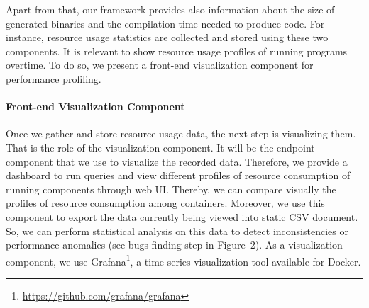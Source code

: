 Apart from that, our framework provides also information about the size of generated binaries and the compilation time needed to produce code.
For instance, resource usage statistics are collected and stored using these two components. It is relevant to show resource usage profiles of running programs overtime. To do so, we present a front-end visualization component for performance profiling. 

\paragraph{Front-end Visualization Component}
Once we gather and store resource usage data, the next step is visualizing them. That is the role of the visualization component. It will be the endpoint component that we use to visualize the recorded data. Therefore, we provide a dashboard to run queries and view different profiles of resource consumption of running components through web UI. Thereby, we can compare visually the profiles of resource consumption among containers. Moreover, we use this component to export the data currently being viewed into static CSV document. So, we can perform statistical analysis on this data to detect inconsistencies or performance anomalies (see bugs finding step in Figure~2).
As a visualization component, we use Grafana\footnote{\url{https://github.com/grafana/grafana}}, a time-series visualization tool available for Docker. 




